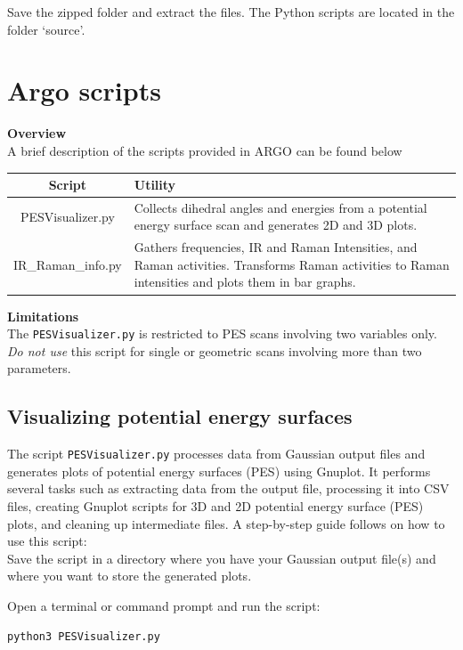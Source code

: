 \documentclass[12pt]{article}
\begin{document}
Save the zipped folder and extract the files. The Python scripts are located in the folder `source'. 

\section{Argo scripts}

\textbf{Overview\\}
A brief description of the scripts provided in ARGO can be found below 
\begin{table}[ht]
\centering
\begin{tabular}{|c|p{10cm}|}
\hline
\multicolumn{1}{|c|}{Script} & Utility \\
\hline
PESVisualizer.py & Collects dihedral angles and energies from a potential energy surface scan and generates 2D and 3D plots. \\
\hline
IR\_Raman\_info.py & Gathers frequencies, IR and Raman Intensities, and Raman activities. Transforms Raman activities to Raman intensities and plots them in bar graphs. \\
\hline
\end{tabular}
\end{table}

\textbf{Limitations\\}
The \texttt{PESVisualizer.py} is restricted to PES scans involving two variables only. \textit{Do not use} this script for single or geometric scans involving more than two parameters.

\newpage
\subsection{Visualizing potential energy surfaces}
The script \texttt{PESVisualizer.py} processes data from Gaussian output files and generates plots of potential energy surfaces (PES) using Gnuplot. It performs several tasks such as extracting data from the output file, processing it into CSV files, creating Gnuplot scripts for 3D and 2D potential energy surface (PES) plots, and cleaning up intermediate files. A step-by-step guide follows on how to use this script:\\

    Save the script in a directory where you have your Gaussian output file(s) and where you want to store the generated plots.

    Open a terminal or command prompt and run the script:
\begin{lstlisting}[style=python]
python3 PESVisualizer.py
\end{lstlisting}
\end{document}
